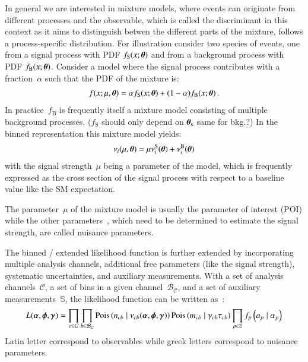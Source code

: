 
In general we are interested in mixture models, where events can
originate from different processes and the observable, which is called
the discriminant in this context as it aims to distinguish betwen the
different parts of the mixture, follows a process-specific
distribution. For illustration consider two species of events, one
from a signal process with PDF $f_\text{S}(x; \boldsymbol{\theta})$ and from a
background process with PDF $f_\text{B}(x; \boldsymbol{\theta})$. Consider a
model where the signal process contributes with a fraction~$\alpha$
such that the PDF of the mixture is:
\begin{align*}
  f(x; \mu, \boldsymbol{\theta}) = \alpha f_\text{S}(x; \boldsymbol{\theta}) + (1 - \alpha) f_\text{B}(x; \boldsymbol{\theta}) \,\text{.}
\end{align*}
In practice~$f_\text{B}$ is frequently itself a mixture model
consisting of multiple background processes. ($f_\text{S}$ should only
depend on $\boldsymbol{\theta}_\text{s}$ same for bkg.?) In the binned representation this
mixture model yields:
\begin{align*}
  \nu_i(\mu, \boldsymbol{\theta}) = \mu \nu_i^\text{S}(\boldsymbol{\theta}) + \nu_i^\text{B}(\boldsymbol{\theta})
\end{align*}
with the signal strength~$\mu$ being a parameter of the model, which
is frequently expressed as the cross section of the signal process
with respect to a baseline value like the SM expectation.

The parameter~$\mu$ of the mixture model is usually the parameter of
interest (POI) while the other parameters~\boldtheta, which need to be
determined to estimate the signal strength, are called nuisance
parameters.


The binned / extended likelihood function is further extended by
incorporating multiple analysis channels, additional free parameters
(like the signal strength), systematic uncertainties, and auxiliary
measurements. With a set of analysis channels~$\mathcal{C}$, a set of
bins in a given channel~$\mathcal{B}_\mathcal{C}$, and a set of
auxiliary measurements~$\mathbb{S}$, the likelihood function can be
written as~\cite{cranmer2012}:
\begin{align*}
  L(\boldsymbol{\alpha}, \boldsymbol{\phi}, \boldsymbol{\gamma}) =
  \prod_{c \in \mathcal{C}} \prod_{b \in \mathcal{B}_{\mathcal{C}}}
  \mathrm{Pois}\left( n_{cb} \mid \nu_{cb}(\boldsymbol{\alpha}, \boldsymbol{\phi}, \boldsymbol{\gamma}) \right)
  \mathrm{Pois}\left(m_{cb} \mid  \gamma_{cb} \tau_{cb} \right)
  \prod_{p \in \mathbb{S}} f_p\left(a_p \mid \alpha_p \right)
\end{align*}
Latin letter correspond to observables while greek letters correspond
to nuisance parameters.

